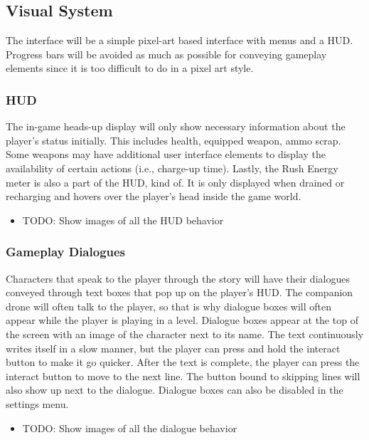\documentclass[12pt]{article}
\begin{document}
\subsection{Visual System}

The interface will be a simple pixel-art based interface with menus and a HUD. Progress bars will be avoided as much as possible for conveying gameplay elements since it is too difficult to do in a pixel art style. 

\subsubsection{HUD}

The in-game heads-up display will only show necessary information about the player's status initially. This includes health, equipped weapon, ammo scrap. Some weapons may have additional user interface elements to display the availability of certain actions (i.e., charge-up time). Lastly, the Rush Energy meter is also a part of the HUD, kind of. It is only displayed when drained or recharging and hovers over the player's head inside the game world. 

\begin{itemize}
	\item TODO: Show images of all the HUD behavior
\end{itemize}

\subsubsection{Gameplay Dialogues}

Characters that speak to the player through the story will have their dialogues conveyed through text boxes that pop up on the player's HUD. The companion drone will often talk to the player, so that is why dialogue boxes will often appear while the player is playing in a level. Dialogue boxes appear at the top of the screen with an image of the character next to its name. The text continuously writes itself in a slow manner, but the player can press and hold the interact button to make it go quicker. After the text is complete, the player can press the interact button to move to the next line. The button bound to skipping lines will also show up next to the dialogue. Dialogue boxes can also be disabled in the settings menu. 

\begin{itemize}
	\item TODO: Show images of all the dialogue behavior
\end{itemize}
\end{document}
